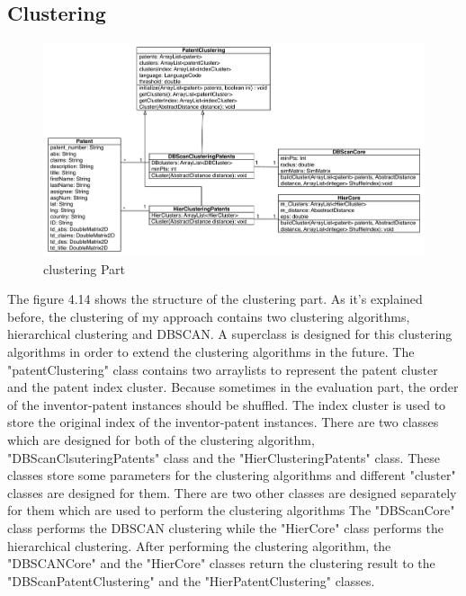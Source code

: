 \subsection{Clustering}
\begin{figure}
\centering
\includegraphics[width=\headwidth]{clusteringPart.pdf}
\caption{clustering Part}
\end{figure}
The figure 4.14 shows the structure of the clustering part. As it's explained before, the clustering of my approach contains two clustering algorithms, hierarchical clustering and DBSCAN. A superclass is designed for this clustering algorithms in order to extend the clustering algorithms in the future. The "patentClustering" class contains two arraylists to represent the patent cluster and the patent index cluster. Because sometimes in the evaluation part, the order of the inventor-patent instances should be shuffled. The index cluster is used to store the original index of the inventor-patent instances. There are two classes which are designed for both of the clustering algorithm, "DBScanClsuteringPatents" class and the "HierClusteringPatents" class. These classes store some parameters for the clustering algorithms and different "cluster" classes are designed for them. There are two other classes are designed separately for them which are used to perform the clustering algorithms The "DBScanCore" class performs the DBSCAN clustering while the "HierCore" class performs the hierarchical clustering. After performing the clustering algorithm, the "DBSCANCore" and the "HierCore" classes return the clustering result  to the "DBScanPatentClustering" and the "HierPatentClustering" classes.

